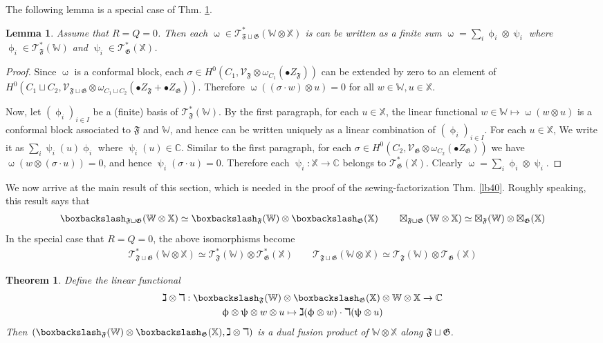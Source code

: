 \documentclass[11pt,b5paper,notitlepage]{article}
\theoremstyle{definition}
\theoremstyle{plain}
\newtheorem{thm}[df]{Theorem}
\newtheorem{lm}[df]{Lemma}
\newcommand{\fk}{\mathfrak}
\newcommand{\SV}{\mathscr{V}}
\newcommand{\blt}{\bullet}
\newcommand{\Xbb}{\mathbb X}
\newcommand{\Wbb}{\mathbb W}
\newcommand{\Cbb}{\mathbb C}
\newcommand{\<}{\left\langle}
\renewcommand{\>}{\right\rangle}
\newcommand{\ST}{\mathscr{T}}
\newcommand{\bbs}{\boxbackslash}
\newcommand{\ff}{\mathfrak{F}}
\newcommand{\fg}{\mathfrak{G}}
\numberwithin{equation}{section}
\begin{document}
The following lemma is a special case of Thm. \ref{lb16}.

\begin{lm}\label{lb17}
Assume that $R=Q=0$. Then each $\upomega\in\ST^*_{\ff\sqcup\fg}(\Wbb\otimes\Xbb)$ is can be written as a finite sum $\upomega=\sum_i \upphi_i\otimes\uppsi_i$ where $\upphi_i\in\ST^*_\ff(\Wbb)$ and $\uppsi_i\in\ST^*_\fg(\Xbb)$.
\end{lm}

\begin{proof}
Since $\upomega$ is a conformal block, each $\sigma\in H^0(C_1,\SV_\ff\otimes\omega_{C_1}(\blt Z_\ff))$ can be extended by zero to an element of $H^0(C_1\sqcup C_2,\SV_{\ff\sqcup\fg}\otimes \omega_{C_1\sqcup C_2}(\blt Z_\ff+\blt Z_\fg))$. Therefore $\upomega((\sigma\cdot w)\otimes u)=0$ for all $w\in\Wbb,u\in\Xbb$. 

Now, let $(\upphi_i)_{i\in I}$ be a (finite) basis of $\ST^*_\ff(\Wbb)$. By the first paragraph, for each $u\in\Xbb$, the linear functional $w\in\Wbb\mapsto \upomega(w\otimes u)$ is a conformal block associated to $\ff$ and $\Wbb$, and hence can be written uniquely as a linear combination of $(\upphi_i)_{i\in I}$. For each $u\in\Xbb$,  We write it as $\sum_i \uppsi_i(u)\upphi_i$ where $\uppsi_i(u)\in\Cbb$. Similar to the first paragraph, for each $\sigma\in H^0(C_2,\SV_\fg\otimes\omega_{C_2}(\blt Z_\fg))$ we have $\upomega(w\otimes (\sigma\cdot u))=0$, and hence $\uppsi_i(\sigma\cdot u)=0$. Therefore each $\uppsi_i:\Xbb\rightarrow\Cbb$ belongs to $\ST^*_\fg(\Xbb)$. Clearly $\upomega=\sum_i \upphi_i\otimes\uppsi_i$.
\end{proof}


We now arrive at the main result of this section, which is needed in the proof of the sewing-factorization Thm. \ref{lb40}. Roughly speaking, this result says that
\begin{gather*}
\bbs_{\ff\sqcup\fg}(\Wbb\otimes\Xbb)\simeq\bbs_\ff(\Wbb)\otimes\bbs_\fg(\Xbb)\qquad\boxtimes_{\ff\sqcup\fg}(\Wbb\otimes\Xbb)\simeq\boxtimes_\ff(\Wbb)\otimes\boxtimes_\fg(\Xbb)
\end{gather*}
In the special case that $R=Q=0$, the above isomorphisms become
\begin{gather*}
\ST^*_{\ff\sqcup\fg}(\Wbb\otimes\Xbb)\simeq\ST^*_\ff(\Wbb)\otimes\ST^*_\fg(\Xbb)\qquad\ST_{\ff\sqcup\fg}(\Wbb\otimes\Xbb)\simeq\ST_\ff(\Wbb)\otimes\ST_\fg(\Xbb)
\end{gather*}




\begin{thm}\label{lb16}
Define the linear functional
\begin{gather*}
\gimel\otimes\daleth: \bbs_{\fk F}(\Wbb)\otimes \bbs_{\fk G}(\Xbb)\otimes\Wbb\otimes \Xbb\rightarrow \Cbb\\
\upphi\otimes\uppsi\otimes w\otimes u\mapsto \gimel(\upphi\otimes w)\cdot\daleth(\uppsi\otimes u)
\end{gather*}
Then $(\bbs_{\fk F}(\Wbb)\otimes \bbs_{\fk G}(\Xbb),\gimel\otimes\daleth)$ is a dual fusion product of $\Wbb\otimes\Xbb$ along $\ff\sqcup\fg$.
\end{thm}
\end{document}
